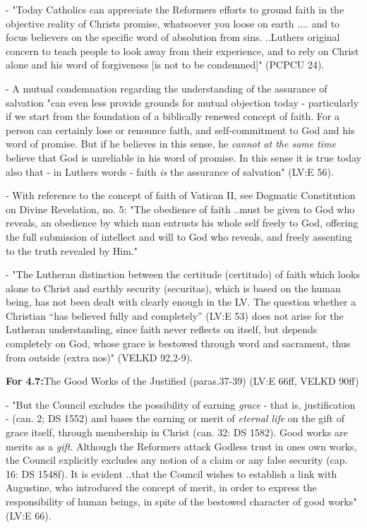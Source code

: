 - "Today Catholics can appreciate the Reformer\textquotesingle s efforts
to ground faith in the objective reality of Christ\textquotesingle s
promise, \textquotesingle whatsoever you loose on earth
....\textquotesingle{} and to focus believers on the specific word of
absolution from sins. ..Luther\textquotesingle s original concern to
teach people to look away from their experience, and to rely on Christ
alone and his word of forgiveness {[}is not to be condemned{]}" (PCPCU
24).

- A mutual condemnation regarding the understanding of the assurance of
salvation "can even less provide grounds for mutual objection today -
particularly if we start from the foundation of a biblically renewed
concept of faith. For a person can certainly lose or renounce faith, and
self-commitment to God and his word of promise. But if he believes in
this sense, he \emph{cannot at the same time} believe that God is
unreliable in his word of promise. In this sense it is true today also
that - in Luther\textquotesingle s words - faith \emph{is} the assurance
of salvation" (LV:E 56).

- With reference to the concept of faith of Vatican II, see Dogmatic
Constitution on Divine Revelation, no. 5: "\textquotesingle The
obedience of faith\textquotesingle{} ..must be given to God who reveals,
an obedience by which man entrusts his whole self freely to God,
offering \textquotesingle the full submission of intellect and will to
God who reveals,\textquotesingle{} and freely assenting to the truth
revealed by Him."

- "The Lutheran distinction between the certitude (certitudo) of faith
which looks alone to Christ and earthly security (securitas), which is
based on the human being, has not been dealt with clearly enough in the
LV. The question whether a Christian ``has believed fully and
completely'' (LV:E 53) does not arise for the Lutheran understanding,
since faith never reflects on itself, but depends completely on God,
whose grace is bestowed through word and sacrament, thus from outside
(extra nos)" (VELKD 92,2-9).

\textbf{For 4.7:}The Good Works of the Justified (paras.37-39) (LV:E
66ff, VELKD 90ff)

- "But the Council excludes the possibility of earning \emph{grace} -
that is, justification - (can. 2; DS 1552) and bases the earning or
merit of \emph{eternal life} on the gift of grace itself, through
membership in Christ (can. 32: DS 1582). Good works are
\textquotesingle merits\textquotesingle{} as a \emph{gift}. Although the
Reformers attack \textquotesingle Godless trust\textquotesingle{} in
one\textquotesingle s own works, the Council explicitly excludes any
notion of a claim or any false security (cap. 16: DS 1548f). It is
evident ..that the Council wishes to establish a link with Augustine,
who introduced the concept of merit, in order to express the
responsibility of human beings, in spite of the
\textquotesingle bestowed\textquotesingle{} character of good works"
(LV:E 66).

